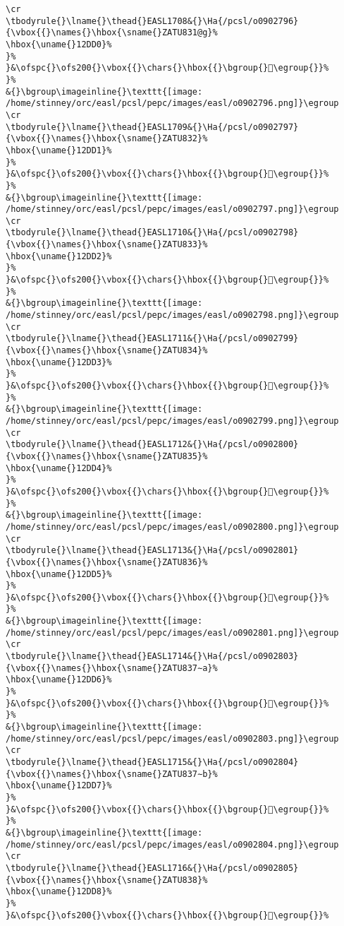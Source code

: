 \begin{verbatim}
\cr
\tbodyrule{}\lname{}\thead{}EASL1708&{}\Ha{/pcsl/o0902796}{\vbox{{}\names{}\hbox{\sname{}ZATU831@g}%
\hbox{\uname{}12DD0}%
}%
}&\ofspc{}\ofs200{}\vbox{{}\chars{}\hbox{{}\bgroup{}𒷐\egroup{}}%
}%
&{}\bgroup\imageinline{}\texttt{[image: /home/stinney/orc/easl/pcsl/pepc/images/easl/o0902796.png]}\egroup
\cr
\tbodyrule{}\lname{}\thead{}EASL1709&{}\Ha{/pcsl/o0902797}{\vbox{{}\names{}\hbox{\sname{}ZATU832}%
\hbox{\uname{}12DD1}%
}%
}&\ofspc{}\ofs200{}\vbox{{}\chars{}\hbox{{}\bgroup{}𒷑\egroup{}}%
}%
&{}\bgroup\imageinline{}\texttt{[image: /home/stinney/orc/easl/pcsl/pepc/images/easl/o0902797.png]}\egroup
\cr
\tbodyrule{}\lname{}\thead{}EASL1710&{}\Ha{/pcsl/o0902798}{\vbox{{}\names{}\hbox{\sname{}ZATU833}%
\hbox{\uname{}12DD2}%
}%
}&\ofspc{}\ofs200{}\vbox{{}\chars{}\hbox{{}\bgroup{}𒷒\egroup{}}%
}%
&{}\bgroup\imageinline{}\texttt{[image: /home/stinney/orc/easl/pcsl/pepc/images/easl/o0902798.png]}\egroup
\cr
\tbodyrule{}\lname{}\thead{}EASL1711&{}\Ha{/pcsl/o0902799}{\vbox{{}\names{}\hbox{\sname{}ZATU834}%
\hbox{\uname{}12DD3}%
}%
}&\ofspc{}\ofs200{}\vbox{{}\chars{}\hbox{{}\bgroup{}𒷓\egroup{}}%
}%
&{}\bgroup\imageinline{}\texttt{[image: /home/stinney/orc/easl/pcsl/pepc/images/easl/o0902799.png]}\egroup
\cr
\tbodyrule{}\lname{}\thead{}EASL1712&{}\Ha{/pcsl/o0902800}{\vbox{{}\names{}\hbox{\sname{}ZATU835}%
\hbox{\uname{}12DD4}%
}%
}&\ofspc{}\ofs200{}\vbox{{}\chars{}\hbox{{}\bgroup{}𒷔\egroup{}}%
}%
&{}\bgroup\imageinline{}\texttt{[image: /home/stinney/orc/easl/pcsl/pepc/images/easl/o0902800.png]}\egroup
\cr
\tbodyrule{}\lname{}\thead{}EASL1713&{}\Ha{/pcsl/o0902801}{\vbox{{}\names{}\hbox{\sname{}ZATU836}%
\hbox{\uname{}12DD5}%
}%
}&\ofspc{}\ofs200{}\vbox{{}\chars{}\hbox{{}\bgroup{}𒷕\egroup{}}%
}%
&{}\bgroup\imageinline{}\texttt{[image: /home/stinney/orc/easl/pcsl/pepc/images/easl/o0902801.png]}\egroup
\cr
\tbodyrule{}\lname{}\thead{}EASL1714&{}\Ha{/pcsl/o0902803}{\vbox{{}\names{}\hbox{\sname{}ZATU837∼a}%
\hbox{\uname{}12DD6}%
}%
}&\ofspc{}\ofs200{}\vbox{{}\chars{}\hbox{{}\bgroup{}𒷖\egroup{}}%
}%
&{}\bgroup\imageinline{}\texttt{[image: /home/stinney/orc/easl/pcsl/pepc/images/easl/o0902803.png]}\egroup
\cr
\tbodyrule{}\lname{}\thead{}EASL1715&{}\Ha{/pcsl/o0902804}{\vbox{{}\names{}\hbox{\sname{}ZATU837∼b}%
\hbox{\uname{}12DD7}%
}%
}&\ofspc{}\ofs200{}\vbox{{}\chars{}\hbox{{}\bgroup{}𒷗\egroup{}}%
}%
&{}\bgroup\imageinline{}\texttt{[image: /home/stinney/orc/easl/pcsl/pepc/images/easl/o0902804.png]}\egroup
\cr
\tbodyrule{}\lname{}\thead{}EASL1716&{}\Ha{/pcsl/o0902805}{\vbox{{}\names{}\hbox{\sname{}ZATU838}%
\hbox{\uname{}12DD8}%
}%
}&\ofspc{}\ofs200{}\vbox{{}\chars{}\hbox{{}\bgroup{}𒷘\egroup{}}%

\end{verbatim}
